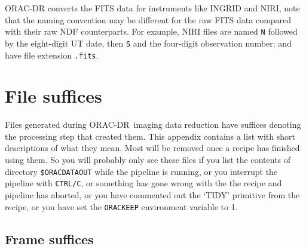 \documentclass[twoside,11pt]{article}
\newcommand{\xlabel}[1]{}
\renewcommand{\_}{\texttt{\symbol{95}}}
\newcommand{\ORACDR}{{\footnotesize ORAC-DR}}
\begin{document}
ORAC-DR converts the FITS data for instruments like INGRID and NIRI,
note that the naming convention may be different for the raw FITS data
compared with their raw NDF counterparts.  For example, NIRI files
are named {\tt{N}} followed by the eight-digit UT date, then {\tt{S}} and
the four-digit observation number; and have file extension {\tt{.fits}}.

\newpage
\section{\xlabel{file_suffices}File suffices}\label{file_suffices}%

Files generated during \ORACDR\ imaging data reduction have suffices
denoting the processing step that created them.  This appendix
contains a list with short descriptions of what they mean.  Most will
be removed once a recipe has finished using them.  So you will
probably only see these files if you list the contents of directory
{\tt \$ORAC\_DATA\_OUT} while the pipeline is running, or you interrupt the
pipeline with {\tt CTRL/C}, or something has gone wrong with the the
recipe and pipeline has aborted, or you have commented out the `\_TIDY'
primitive from the recipe, or you have set the {\tt ORAC\_KEEP} environment
variable to 1.

\subsection*{Frame suffices}%
\end{document}
